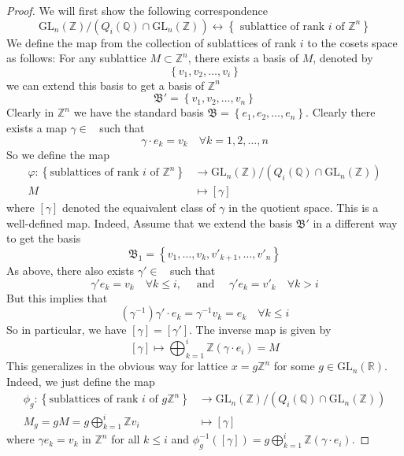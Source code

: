 \documentclass[12pt]{article} %
\DeclareMathOperator{\glnz}{GL_n(\mathbb{Z})}
\begin{document}
\begin{proof}
    We will first show the following correspondence
    \[ \text{GL}_n(\mathbb{Z})/(Q_i(\mathbb{Q}) \cap \text{GL}_n(\mathbb{Z})) \longleftrightarrow \left\lbrace \text{ sublattice of rank $i$ of $\mathbb{Z}^n$}\right\rbrace\]
    We define the map from the collection of sublattices of rank $i$ to the cosets space as follows: For any sublattice $M \subset \mathbb{Z}^n$, there exists
    a basis of $M$, denoted by
    \[\left\lbrace v_1,v_2,\ldots, v_i \right\rbrace \]
    we can extend this basis to get a basis of $\mathbb{Z}^n$
    \[\mathfrak{B'} = \left\lbrace v_1,v_2,\ldots, v_n \right\rbrace \]
    Clearly in $\mathbb{Z}^n$ we have the standard basis $\mathfrak{B} = \left\lbrace e_1,e_2,\ldots,e_n\right\rbrace $. Clearly there
    exists a map $\gamma \in \glnz$ such that
    \[\gamma \cdot e_k = v_k \quad \forall k = 1,2,\ldots, n\]
    So we define the map
    \begin{align*}
        \varphi \colon \left\lbrace\text{sublattices of rank $i$ of $\mathbb{Z}^n$}\right\rbrace & \to \text{GL}_n(\mathbb{Z})/(Q_i(\mathbb{Q}) \cap \text{GL}_n(\mathbb{Z})) \\
        M                                                                                        & \mapsto [\gamma]
    \end{align*}
    where $[\gamma]$ denoted the equaivalent class of $\gamma$ in the quotient space. This is a well-defined map. Indeed, Assume that we extend
    the basis $\mathfrak{B'}$ in a different way to get the basis
    \[ \mathfrak{B}_1 = \left\lbrace v_1,\ldots, v_k, v'_{k+1},\ldots,v'_n \right\rbrace\]
    As above, there also exists $\gamma' \in \glnz$ such that
    \[\gamma' e_k = v_k \quad \forall k \le i, \quad \text{ and } \quad \gamma'e_k = v'_k \quad \forall k > i\]
    But this implies that
    \[(\gamma^{-1})\gamma ' \cdot e_k = \gamma^{-1} v_k = e_k \quad \forall k \le i\]
    So in particular, we have $[\gamma] = [\gamma']$. The inverse map is given by
    \[[\gamma] \mapsto \bigoplus_{k=1}^i\mathbb{Z} (\gamma \cdot e_i) = M\]
    This generalizes in the obvious way for lattice $x = g\mathbb{Z}^n$ for some $g \in \text{GL}_n(\mathbb{R})$. Indeed, we just define
    the map
    \begin{align*}
        \phi_g \colon \left\lbrace\text{sublattices of rank $i$ of $g\mathbb{Z}^n$}\right\rbrace & \to \text{GL}_n(\mathbb{Z})/(Q_i(\mathbb{Q}) \cap \text{GL}_n(\mathbb{Z})) \\
        M_g = gM = g \bigoplus_{k=1}^i  \mathbb{Z}v_i                                            & \mapsto [\gamma]
    \end{align*}
    where $\gamma e_k = v_k$ in $\mathbb{Z}^n$ for all $ k \le i$ and $\phi_g^{-1}([\gamma]) = g \bigoplus_{k=1}^i  \mathbb{Z}(\gamma \cdot e_i)$.
\end{proof}
\end{document}
